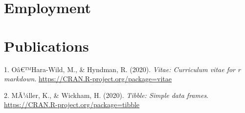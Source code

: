 \documentclass[11pt, a4paper]{awesome-cv}
\begin{document}
\hypertarget{employment}{%
\section{Employment}\label{employment}}

\begin{cvhonors}
\end{cvhonors}

\hypertarget{publications}{%
\section{Publications}\label{publications}}

\hypertarget{bibliography}{}
\leavevmode\hypertarget{ref-R-vitae}{}%
1. Oâ€™Hara-Wild, M., \& Hyndman, R. (2020). \emph{Vitae: Curriculum
vitae for r markdown}. \url{https://CRAN.R-project.org/package=vitae}

\leavevmode\hypertarget{ref-R-tibble}{}%
2. MÃ¼ller, K., \& Wickham, H. (2020). \emph{Tibble: Simple data
frames}. \url{https://CRAN.R-project.org/package=tibble}
\end{document}
